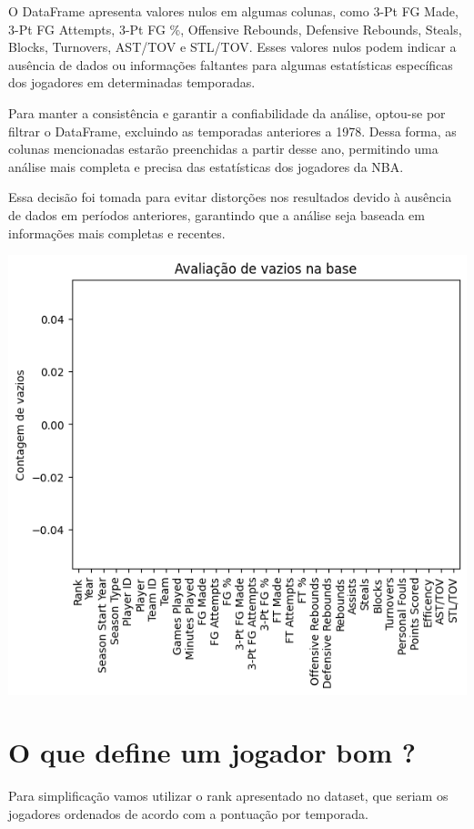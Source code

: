 \documentclass[
]{book}
\begin{document}
O DataFrame apresenta valores nulos em algumas colunas, como 3-Pt FG Made, 3-Pt FG Attempts, 3-Pt FG \%, Offensive Rebounds, Defensive Rebounds, Steals, Blocks, Turnovers, AST/TOV e STL/TOV. Esses valores nulos podem indicar a ausência de dados ou informações faltantes para algumas estatísticas específicas dos jogadores em determinadas temporadas.

Para manter a consistência e garantir a confiabilidade da análise, optou-se por filtrar o DataFrame, excluindo as temporadas anteriores a 1978. Dessa forma, as colunas mencionadas estarão preenchidas a partir desse ano, permitindo uma análise mais completa e precisa das estatísticas dos jogadores da NBA.

Essa decisão foi tomada para evitar distorções nos resultados devido à ausência de dados em períodos anteriores, garantindo que a análise seja baseada em informações mais completas e recentes.

\includegraphics{imagens/2.png}

\hypertarget{o-que-define-um-jogador-bom}{%
\chapter{O que define um jogador bom ?}\label{o-que-define-um-jogador-bom}}

Para simplificação vamos utilizar o rank apresentado no dataset, que seriam os jogadores ordenados de acordo com a pontuação por temporada.
\end{document}
